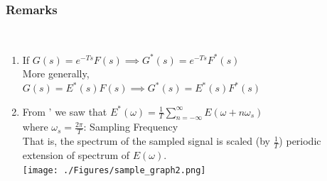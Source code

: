 \documentclass[mathserif, 10pt]{beamer} %
\def\3{\raisebox{.5pt}{\textcircled{\raisebox{-.9pt} {3}}}}
\begin{document}
\frame
{

\normalsize

\frametitle{Remarks}

\textcolor{red}{}\\

\begin{enumerate}
  \item If $G(s) = e^{-Ts}F(s) \implies G^*(s) = e^{-Ts}F^*(s)$\\
More generally,\\
$G(s)=E^*(s)F(s) \implies G^*(s) = E^*(s)F^*(s)$
	\item From \3' we saw that $E^*(\omega) = \frac{1}{T} \sum\limits_{n=-\infty}^{\infty} E(\omega+n\omega_s)$\\
where $\omega_s = \frac{2\pi}{T}$:  Sampling Frequency\\
That is, the spectrum of the sampled signal is scaled (by $\frac{1}{T}$) periodic extension of spectrum of $E(\omega)$. \\

\texttt{[image: ./Figures/sample\_graph2.png]} \\%


\end{enumerate}


}
\end{document}
